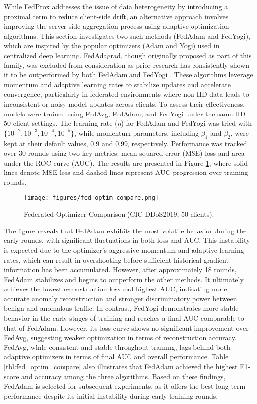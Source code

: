 While FedProx addresses the issue of data heterogeneity by introducing a proximal term to reduce client-side drift, an alternative approach involves improving the server-side aggregation process using adaptive optimization algorithms. This section investigates two such methods (FedAdam and FedYogi), which are inspired by the popular optimizers (Adam and Yogi) used in centralized deep learning. FedAdagrad, though originally proposed as part of this family, was excluded from consideration as prior research has consistently shown it to be outperformed by both FedAdam and FedYogi \citep{fedoptim}. These algorithms leverage momentum and adaptive learning rates to stabilize updates and accelerate convergence, particularly in federated environments where non-IID data leads to inconsistent or noisy model updates across clients. To assess their effectiveness, models were trained using FedAvg, FedAdam, and FedYogi under the same IID 50-client settings. The learning rate ($\eta$) for FedAdam and FedYogi was tried with $\{10^{-2}, 10^{-3}, 10^{-4}, 10^{-5}\}$, while momentum parameters, including $\beta_1$ and $\beta_2$, were kept at their default values, 0.9 and 0.99, respectively. Performance was tracked over 30 rounds using two key metrics: mean squared error (MSE) loss and area under the ROC curve (AUC). The results are presented in Figure \ref{fig:fed_optim_compare}, where solid lines denote MSE loss and dashed lines represent AUC progression over training rounds.

\begin{figure}[h]
    \centering
    \texttt{[image: figures/fed\_optim\_compare.png]}
    \caption{Federated Optimizer Comparison (CIC-DDoS2019, 50 clients).}
    \label{fig:fed_optim_compare}
\end{figure}

The figure reveals that FedAdam exhibits the most volatile behavior during the early rounds, with significant fluctuations in both loss and AUC. This instability is expected due to the optimizer’s aggressive momentum and adaptive learning rates, which can result in overshooting before sufficient historical gradient information has been accumulated. However, after approximately 18 rounds, FedAdam stabilizes and begins to outperform the other methods. It ultimately achieves the lowest reconstruction loss and highest AUC, indicating more accurate anomaly reconstruction and stronger discriminatory power between benign and anomalous traffic. In contrast, FedYogi demonstrates more stable behavior in the early stages of training and reaches a final AUC comparable to that of FedAdam. However, its loss curve shows no significant improvement over FedAvg, suggesting weaker optimization in terms of reconstruction accuracy. FedAvg, while consistent and stable throughout training, lags behind both adaptive optimizers in terms of final AUC and overall performance. Table \ref{tbl:fed_optim_compare} also illustrates that FedAdam achieved the highest F1-score and accuracy among the three algorithms. Based on these findings, FedAdam is selected for subsequent experiments, as it offers the best long-term performance despite its initial instability during early training rounds.

